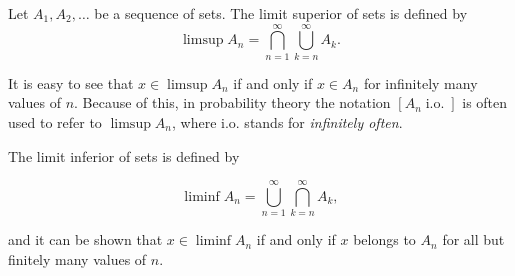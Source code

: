 \documentclass[12pt]{article}
\begin{document}
Let $A_1,A_2,\dots$ be a sequence of sets. 
The limit superior of sets is defined by
\[\limsup A_n = \bigcap_{n=1}^\infty \bigcup_{k=n}^\infty A_k.\]

It is easy to see that $x\in \limsup A_n$ if and only if $x\in A_n$ for infinitely many values of $n$.
Because of this, in probability theory the notation $[A_n \operatorname{i.o.}]$ is often used to refer to $\limsup A_n$, where i.o. stands for \textit{infinitely often}.

The limit inferior of sets is defined by

\[\liminf A_n = \bigcup_{n=1}^\infty \bigcap_{k=n}^\infty A_k,\]

and it can be shown that $x\in \liminf A_n$ if and only if $x$ belongs to $A_n$ for all but finitely many values of $n$.
\end{document}
